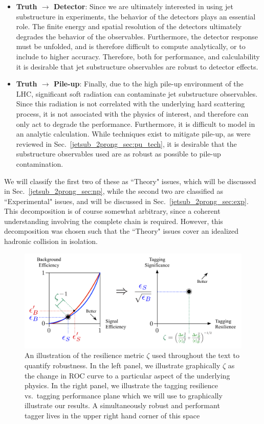 \documentclass[11pt,letterpaper]{article}
\begin{document}
\begin{itemize}
%
\item {\bf Truth $\to$ Detector}: Since we are ultimately interested in using jet substructure in experiments, the behavior of the detectors plays an essential role.
%
The finite energy and spatial resolution of the detectors ultimately degrades the behavior of the observables.
%
Furthermore, the detector response must be unfolded, and is therefore difficult to compute analytically, or to include to higher accuracy. Therefore, both for performance, and calculability it is desirable that jet substructure observables are robust to detector effects.
%
\item {\bf Truth $\to$ Pile-up}: Finally, due to the high pile-up environment of the LHC, significant soft radiation can contaminate jet substructure observables.
%
Since this radiation is not correlated with the underlying hard scattering process, it is not associated with the physics of interest, and therefore can only act to degrade the performance.
%
Furthermore, it is difficult to model in an analytic calculation.
%
While techniques exist to mitigate pile-up, as were reviewed in Sec.~\ref{jetsub_2prong_sec:pu_tech}, it is desirable that the substructure observables used are as robust as possible to pile-up contamination.
%
\end{itemize}
%
We will classify the first two of these as ``Theory" issues, which will be discussed in Sec.~\ref{jetsub_2prong_sec:np}, while the second two are classified as ``Experimental" issues, and will be discussed in Sec.~\ref{jetsub_2prong_sec:exp}. This decomposition is of course somewhat arbitrary, since a coherent understanding involving the complete chain is required. However, this decomposition was chosen such that the ``Theory" issues cover an idealized hadronic collision in isolation. 

\begin{figure}[t]
\begin{center}
\includegraphics[width=1.0\columnwidth]{jetsub_2prong_roc_to_significance}
\end{center}
\caption{An illustration of the resilience metric $\zeta$ used throughout the text to quantify robustness. In the left panel, we illustrate graphically $\zeta$ as the change in ROC curve to a particular aspect of the underlying physics. In the right panel, we illustrate the tagging resilience vs.\ tagging performance plane which we will use to graphically illustrate our results.  A simultaneously robust and performant tagger lives in the upper right hand corner of this space}
\label{jetsub_2prong_fig:zeta_def}
\end{figure}
\end{document}
